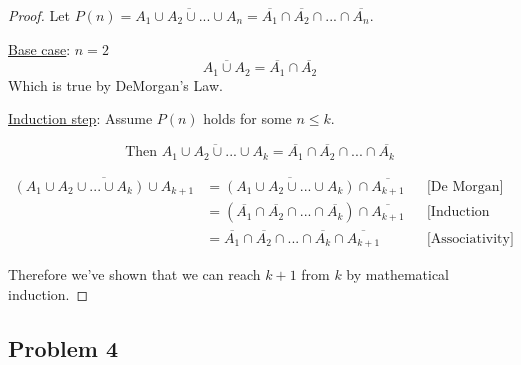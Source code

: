 \documentclass[10pt]{article}
\begin{document}
\begin{proof}
  Let $P(n) = \overline{A_{1} \cup A_{2} \cup ... \cup A_{n}} = \overline{A_{1}}
  \cap \overline{A_{2}} \cap ... \cap \overline{A_{n}}$.
  \spacing

  \noindent
  \underline{Base case}: $n = 2$
  $$\overline{A_{1} \cup A_{2}} = \overline{A_{1}} \cap \overline{A_{2}}$$
  Which is true by DeMorgan's Law.
  \spacing

  \noindent
  \underline{Induction step}:
  Assume $P(n)$ holds for some $n \le k$.

  $$\text{Then } \overline{A_{1} \cup A_{2} \cup ... \cup A_{k}} =
  \overline{A_{1}} \cap \overline{A_{2}} \cap ... \cap \overline{A_{k}}$$

  \begin{align*}
  \overline{(A_{1} \cup A_{2} \cup ... \cup A_{k}) \cup A_{k + 1}} &=
  \overline{(A_{1} \cup A_{2} \cup ... \cup A_{k})} \cap \overline{A_{k+1}} && \text{[De Morgan]}\\
    &= (\overline{A_{1}} \cap \overline{A_{2}} \cap ... \cap \overline{A_{k}})
      \cap \overline{A_{k + 1}} && \text{[Induction Hypothesis]} \\
    &= \overline{A_{1}} \cap \overline{A_{2}} \cap ...
      \cap \overline{A_{k}} \cap \overline{A_{k + 1}} && \text{[Associativity]}
  \end{align*}

  \noindent
  Therefore we've shown that we can reach $k + 1$ from $k$ by mathematical induction.
\end{proof}

\newpage
\subsection*{Problem 4}
\end{document}
